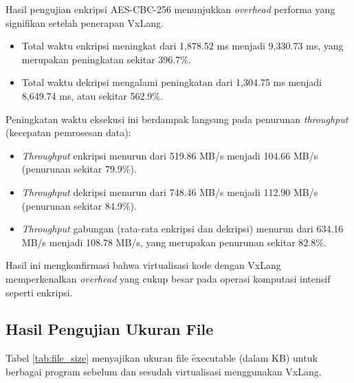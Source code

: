 Hasil pengujian enkripsi AES-CBC-256  menunjukkan \textit{overhead} performa yang signifikan setelah penerapan VxLang.
\begin{itemize}
    \item Total waktu enkripsi meningkat dari 1,878.52 ms menjadi 9,330.73 ms, yang merupakan peningkatan sekitar 396.7\%.
    \item Total waktu dekripsi mengalami peningkatan dari 1,304.75 ms menjadi 8,649.74 ms, atau sekitar 562.9\%.
\end{itemize}
Peningkatan waktu eksekusi ini berdampak langsung pada penurunan \textit{throughput} (kecepatan pemrosesan data):
\begin{itemize}
    \item \textit{Throughput} enkripsi menurun dari 519.86 MB/s menjadi 104.66 MB/s (penurunan sekitar 79.9\%).
    \item \textit{Throughput} dekripsi menurun dari 748.46 MB/s menjadi 112.90 MB/s (penurunan sekitar 84.9\%).
    \item \textit{Throughput} gabungan (rata-rata enkripsi dan dekripsi) menurun dari 634.16 MB/s menjadi 108.78 MB/s, yang merupakan penurunan sekitar 82.8\%.
\end{itemize}
Hasil ini mengkonfirmasi bahwa virtualisasi kode dengan VxLang memperkenalkan \textit{overhead} yang cukup besar pada operasi komputasi intensif seperti enkripsi. 

\subsection{Hasil Pengujian Ukuran File}
Tabel \ref{tab:file_size} menyajikan ukuran file \f{executable} (dalam KB) untuk berbagai program sebelum dan sesudah virtualisasi menggunakan VxLang.

